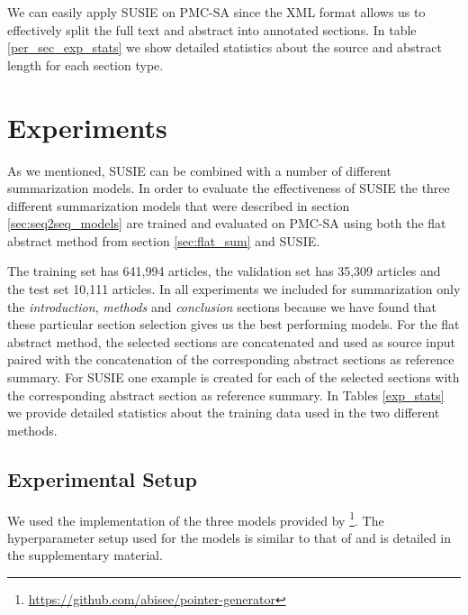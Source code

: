 \documentclass[runningheads]{llncs}
\begin{document}
We can easily apply SUSIE on PMC-SA since the XML format allows us to effectively split the full text and abstract into annotated sections. In table \ref{per_sec_exp_stats} we show detailed statistics about the source and abstract length for each section type.

\section{Experiments}


As we mentioned, SUSIE can be combined with a number of different summarization models. In order to evaluate the effectiveness of SUSIE the three different summarization models that were described in section \ref{sec:seq2seq_models} are trained and evaluated on PMC-SA using both the flat abstract method from section \ref{sec:flat_sum} and SUSIE.


The training set has 641,994 articles, the validation set has 35,309 articles and the test set 10,111 articles. In all experiments we included for summarization only the {\em introduction}, {\em methods} and {\em conclusion} sections because we have found that these particular section selection gives us the best performing models. For the flat abstract method, the selected sections are concatenated and used as source input paired with the concatenation of the corresponding abstract sections as reference summary. For SUSIE one example is created for each of the selected sections with the corresponding abstract section as reference summary. In Tables \ref{exp_stats} we provide detailed statistics about the training data used in the two different methods.


\subsection{Experimental Setup}

We used the implementation of the three models provided by \cite{See2017GetNetworks}\footnote{\url{https://github.com/abisee/pointer-generator}}. The hyperparameter setup used for the models is similar to that of \cite{See2017GetNetworks} and is detailed in the supplementary material. 
\end{document}
